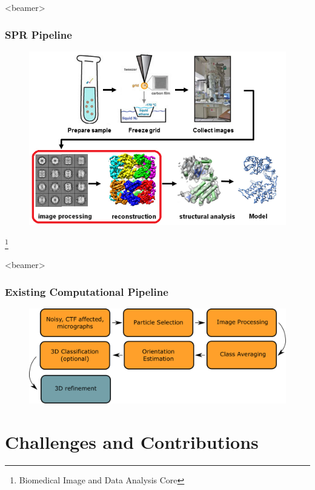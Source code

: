 \documentclass{beamer}
\newcommand\blfootnote[1]{%
  \begingroup
  \renewcommand\thefootnote{}\footnote{#1}%
  \addtocounter{footnote}{-1}%
  \endgroup
}
\begin{document}
\begin{frame}<beamer>
\frametitle{SPR Pipeline}
\begin{figure}[h]
\centering
{\includegraphics[scale=0.55]{figures/pipeline_pics.png}}
\label{fig:rawims}
\end{figure}
\blfootnote{Biomedical Image and Data Analysis Core}
\end{frame}

\begin{frame}<beamer>
\frametitle{Existing Computational Pipeline}
\begin{figure}[h]
\centering
{\includegraphics[scale=0.35]{figures/cryoem_pipeline_edited.pdf}}\\
\label{fig:rawims}
\end{figure}
\end{frame}

\section{Challenges and Contributions}
\end{document}
